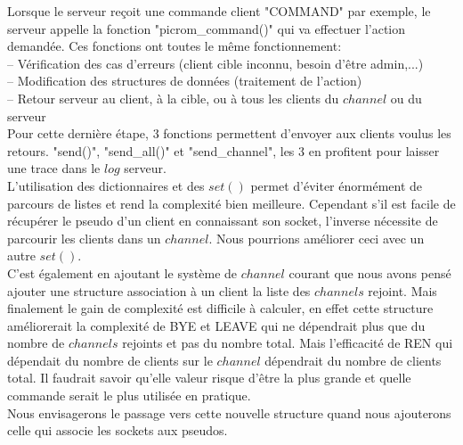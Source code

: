 \documentclass[12pt]{article}
\begin{document}
Lorsque le serveur reçoit une commande client "COMMAND" par exemple, le serveur appelle
la fonction "picrom\_command()" qui va effectuer l'action demandée. Ces fonctions ont toutes
le même fonctionnement:
\\-- Vérification des cas d'erreurs (client cible inconnu, besoin d'être admin,...)
\\-- Modification des structures de données (traitement de l'action)
\\-- Retour serveur au client, à la cible, ou à tous les clients du $channel$ ou du serveur
\\Pour cette dernière étape, 3 fonctions permettent d'envoyer aux clients voulus les retours.
"send()",
"send\_all()" et "send\_channel", les 3 en profitent pour laisser une trace dans le $log$ serveur.
\\

L'utilisation des dictionnaires et des $set()$ permet d'éviter énormément de parcours
de listes et rend la complexité bien meilleure. Cependant s'il est facile de récupérer le
pseudo d'un client en connaissant son socket, l'inverse nécessite de parcourir les clients
dans un $channel$. Nous pourrions améliorer ceci avec un autre $set()$.
\\C'est également en ajoutant le système de $channel$ courant que nous avons pensé ajouter
une structure association à un client la liste des $channels$ rejoint. Mais finalement le
gain de complexité est difficile à calculer, en effet cette structure améliorerait la complexité
de BYE et LEAVE qui ne dépendrait plus que du nombre de $channels$ rejoints et pas du nombre total.
Mais l'efficacité de REN qui dépendait du nombre de clients sur le $channel$ dépendrait du nombre de clients
total. Il faudrait savoir qu'elle valeur risque d'être la plus grande et quelle commande serait
le plus utilisée en pratique.
\\Nous envisagerons le passage vers cette nouvelle structure quand nous ajouterons celle qui
associe les sockets aux pseudos.
\\
\end{document}
